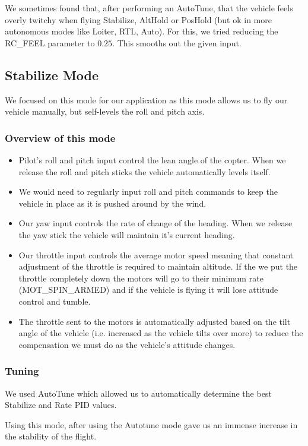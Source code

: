 We sometimes found that, after performing an AutoTune, that the vehicle feels overly twitchy when flying Stabilize, AltHold or PosHold (but ok in more autonomous modes like Loiter, RTL, Auto). For this, we tried reducing the RC\_FEEL parameter to $0.25$. This smooths out the given input.

\subsection{Stabilize Mode}
We focused on this mode for our application as this mode allows us to fly our vehicle manually, but self-levels the roll and pitch axis.

\subsubsection{Overview of this mode}
\begin{itemize}
	\item Pilot’s roll and pitch input control the lean angle of the copter. When we release the roll and pitch sticks the vehicle automatically levels itself.
	\item We would need to regularly input roll and pitch commands to keep the vehicle in place as it is pushed around by the wind.
	\item Our yaw input controls the rate of change of the heading. When we release the yaw stick the vehicle will maintain it’s current heading.
	\item Our throttle input controls the average motor speed meaning that constant adjustment of the throttle is required to maintain altitude. If the we put the throttle completely down the motors will go to their minimum rate (MOT\_SPIN\_ARMED) and if the vehicle is flying it will lose attitude control and tumble.
	\item The throttle sent to the motors is automatically adjusted based on the tilt angle of the vehicle (i.e. increased as the vehicle tilts over more) to reduce the compensation we must do as the vehicle’s attitude changes.
	
\end{itemize}
\subsubsection{Tuning}
 We used AutoTune which allowed us to automatically determine the best Stabilize and Rate PID values. 
 
Using this mode, after using the Autotune mode gave us an immense increase in the stability of the flight.



